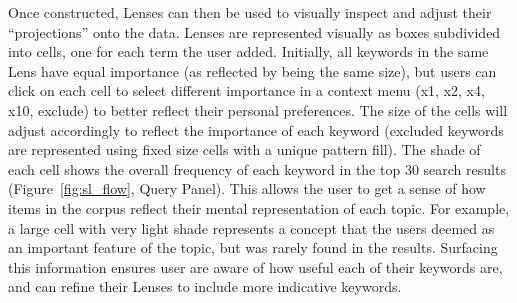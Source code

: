 Once constructed, Lenses can then be used to visually inspect and adjust their ``projections'' onto the data. Lenses are represented visually as boxes subdivided into cells, one for each term the user added. Initially, all keywords in the same Lens have equal importance (as reflected by being the same size), but users can click on each cell to select different importance in a context menu (x1, x2, x4, x10, exclude) to better reflect their personal preferences. The size of the cells will adjust accordingly to reflect the importance of each keyword (excluded keywords are represented using fixed size cells with a unique pattern fill). The shade of each cell shows the overall frequency of each keyword in the top 30 search results (Figure~\ref{fig:sl_flow}, Query Panel). This allows the user to get a sense of how items in the corpus reflect their mental representation of each topic. For example, a large cell with very light shade represents a concept that the users deemed as an important feature of the topic, but was rarely found in the results. Surfacing this information ensures user are aware of how useful each of their keywords are, and can refine their Lenses to include more indicative keywords.




